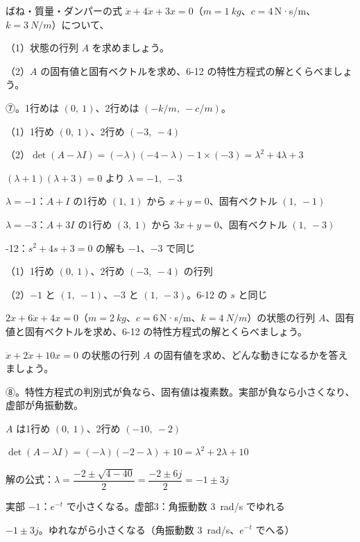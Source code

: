 \begin{reidai}[ばね・ダンパーの状態の行列]
ばね・質量・ダンパーの式 $\ddot x+4\dot x+3x=0$（$m=\qty{1}{kg}$、$c=4$\,N·s/m、$k=\qty{3}{N/m}$）について、\par
（1）状態の行列 $A$ を求めましょう。\par
（2）$A$ の固有値と固有ベクトルを求め、6-12 の特性方程式の解とくらべましょう。\par
\kangaekata ⑦。1行めは $(0,\ 1)$、2行めは $(-k/m,\ -c/m)$。\par
\shiki\kviiis{}\zw{} （1）1行め $(0,\ 1)$、2行め $(-3,\ -4)$\par
\kviiia （2）$\det(A-\lambda I)=(-\lambda)(-4-\lambda)-1\times(-3)=\lambda^2+4\lambda+3$\par
\kviiib $(\lambda+1)(\lambda+3)=0$ より $\lambda=-1,\ -3$\par
\kviiia $\lambda=-1$：$A+I$ の1行め $(1,\ 1)$ から $x+y=0$、固有ベクトル $(1,\ -1)$\par
\kviiia $\lambda=-3$：$A+3I$ の1行め $(3,\ 1)$ から $3x+y=0$、固有ベクトル $(1,\ -3)$\par
{}-12：$s^2+4s+3=0$ の解も $-1$、$-3$ で同じ\par
\kotae\kviiis{}\zw{} （1）1行め $(0,\ 1)$、2行め $(-3,\ -4)$ の行列\par
\kviiia （2）$-1$ と $(1,\ -1)$、$-3$ と $(1,\ -3)$。6-12 の $s$ と同じ
\end{reidai}

\begin{jibun}
$2\ddot x+6\dot x+4x=0$（$m=\qty{2}{kg}$、$c=6$\,N·s/m、$k=\qty{4}{N/m}$）の状態の行列 $A$、固有値と固有ベクトルを求め、6-12 の特性方程式の解とくらべましょう。
\end{jibun}

\begin{reidai}[複素数の固有値]
$\ddot x+2\dot x+10x=0$ の状態の行列 $A$ の固有値を求め、どんな動きになるかを答えましょう。\par
\kangaekata ⑧。特性方程式の判別式が負なら、固有値は複素数。実部が負なら小さくなり、虚部が角振動数。\par
\shiki\kviiis{}\zw{} $A$ は1行め $(0,\ 1)$、2行め $(-10,\ -2)$\par
\kviiia $\det(A-\lambda I)=(-\lambda)(-2-\lambda)+10=\lambda^2+2\lambda+10$\par
\kviiia 解の公式：$\lambda=\dfrac{-2\pm\sqrt{4-40}}{2}=\dfrac{-2\pm6j}{2}=-1\pm3j$\par
\kviiia 実部 $-1$：$e^{-t}$ で小さくなる。虚部3：角振動数 \qty{3}{rad/s} でゆれる\par
\kotae\kviiis{}\zw{} $-1\pm3j$。ゆれながら小さくなる（角振動数 \qty{3}{rad/s}、$e^{-t}$ でへる）
\end{reidai}

